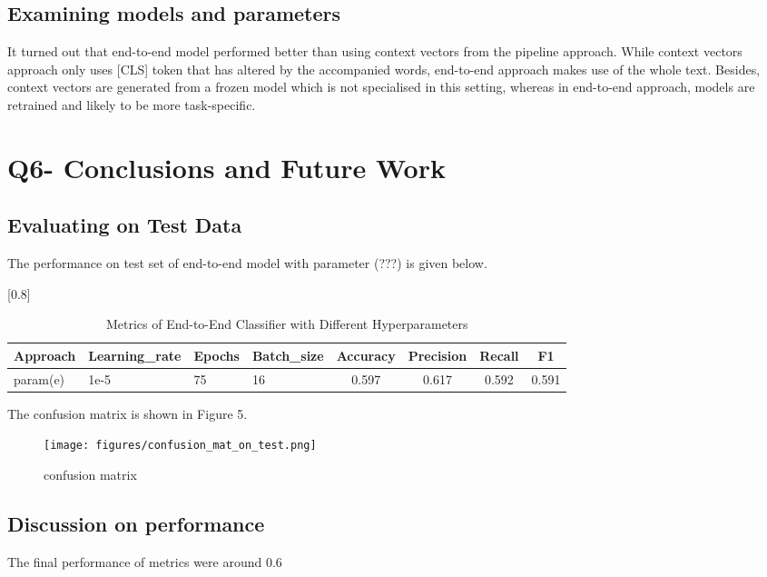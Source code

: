 \documentclass[a4paper,11pt]{article}
\begin{document}
\subsection{Examining models and parameters}
It turned out that end-to-end model performed better than using context vectors from the pipeline approach.
While context vectors approach only uses [CLS] token that has altered by the accompanied words,
end-to-end approach makes use of the whole text.
Besides, context vectors are generated from a frozen model which is not specialised in this setting,
whereas in end-to-end approach, models are retrained and likely to be more task-specific.


\section{Q6- Conclusions and Future Work}
\subsection{Evaluating on Test Data}
The performance on test set of end-to-end model with parameter (???) is given below.
\begin{table}[htbp]
    \caption{Metrics of End-to-End Classifier with Different Hyperparameters}
    \small
    \scalebox{0.8}[0.8]{
    \begin{tabular}{l|lll|cccc}
         Approach & Learning\_rate & Epochs & Batch\_size & Accuracy & Precision & Recall & F1 \\ \hline 
         param(e)                  & 1e-5& 75& 16  & 0.597 & 0.617 & 0.592  & 0.591 \\
    \end{tabular}
    }
\end{table}

The confusion matrix is shown in Figure 5.
\begin{figure}[htbp]
  \begin{center}
  \texttt{[image: figures/confusion\_mat\_on\_test.png]}
  \caption{confusion matrix}
  \end{center}
\end{figure}

\subsection{Discussion on performance}
The final performance of metrics were around 0.6
\end{document}
